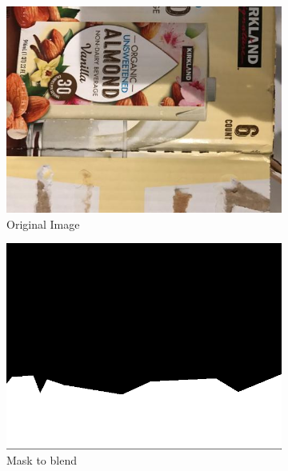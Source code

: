 \documentclass{article}
\begin{document}
\begin{figure}
  \centering
  \begin{subfigure}[b]{0.2\linewidth}
    \includegraphics[width=\linewidth]{data/images/section_4_GP_GAN/cardboard254.jpg}
     \caption{Original Image}
  \end{subfigure}
  \begin{subfigure}[b]{0.2\linewidth}
    \includegraphics[width=\linewidth]{data/images/section_4_GP_GAN/mask_display.png}
    \caption{Mask to blend}
  \end{subfigure}
  \begin{subfigure}[b]{0.2\linewidth}

\end{subfigure}
\end{figure}
\end{document}
